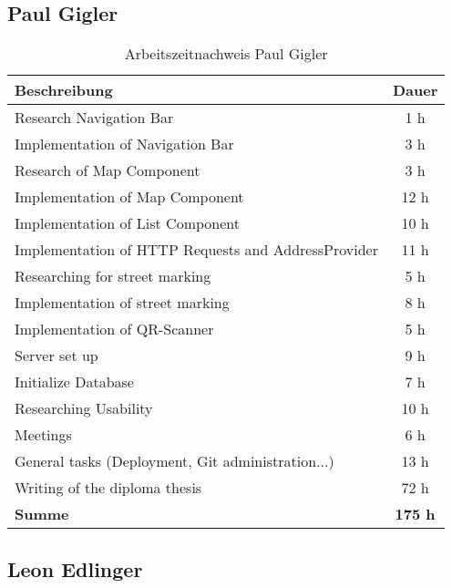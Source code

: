 \subsection{Paul Gigler}

\begin{table}[H]
  \centering
  \begin{tabular}{|p{10cm}|c|}
  \hline
  \textbf{Beschreibung}  & \textbf{Dauer}  \\ \hline
    Research Navigation Bar & 1 h \\ \hline
    Implementation of Navigation Bar & 3 h \\ \hline
    Research of Map Component & 3 h \\ \hline
    Implementation of Map Component & 12 h \\ \hline
    Implementation of List Component & 10 h \\ \hline
    Implementation of HTTP Requests and AddressProvider & 11 h \\ \hline
    Researching for street marking & 5 h \\ \hline
    Implementation of street marking & 8 h \\ \hline
    Implementation of QR-Scanner & 5 h \\ \hline
    Server set up & 9 h \\ \hline
    Initialize Database & 7 h \\ \hline
    Researching Usability & 10 h \\ \hline
    Meetings & 6 h \\ \hline
    General tasks (Deployment, Git administration...) & 13 h \\ \hline
    Writing of the diploma thesis & 72 h \\ \hline
    {\textbf{Summe}} & \textbf{175 h} \\ \hline
   \end{tabular}
  \caption{Arbeitszeitnachweis Paul Gigler}
\end{table}

\subsection{Leon Edlinger}

